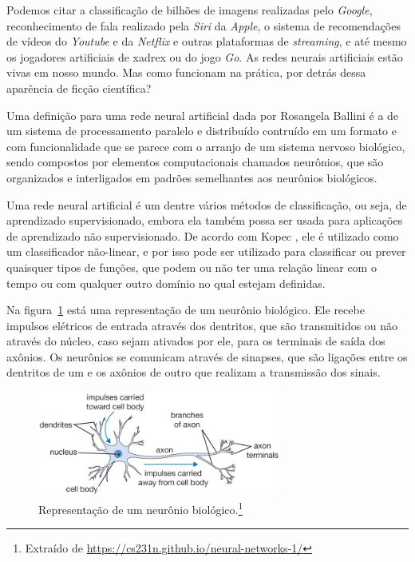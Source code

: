 Podemos citar a classificação de bilhões de imagens realizadas pelo \emph{Google}, reconhecimento de fala realizado pela \emph{Siri} da \emph{Apple}, o sistema de recomendações de vídeos do \emph{Youtube} e da \emph{Netflix} e outras plataformas de \emph{streaming}, e até mesmo os jogadores artificiais de xadrex ou do jogo \emph{Go}. As redes neurais artificiais estão vivas em nosso mundo. Mas como funcionam na prática, por detrás dessa aparência de ficção científica?

Uma definição para uma rede neural artificial dada por Rosangela Ballini \citep{doutorado} é a de um sistema de processamento paralelo e distribuído contruído em um formato e com funcionalidade que se parece com o arranjo de um sistema nervoso biológico, sendo compostos por elementos computacionais chamados neurônios, que são organizados e interligados em padrões semelhantes aos neurônios biológicos.

Uma rede neural artificial é um dentre vários métodos de classificação, ou seja, de aprendizado supervisionado, embora ela também possa ser usada para aplicações de aprendizado não supervisionado. De acordo com Kopec \citep{classic}, ele é utilizado como um classificador não-linear, e por isso pode ser utilizado para classificar ou prever quaisquer tipos de funções, que podem ou não ter uma relação linear com o tempo ou com qualquer outro domínio no qual estejam definidas.

Na figura~\ref{fig:neuron} está uma representação de um neurônio biológico. Ele recebe impulsos elétricos de entrada através dos dentritos, que são transmitidos ou não através do núcleo, caso sejam ativados por ele, para os terminais de saída dos axônios. Os neurônios se comunicam através de sinapses, que são ligações entre os dentritos de um e os axônios de outro que realizam a transmissão dos sinais. 

\begin{figure}[htb]
\centering
\includegraphics[width=8cm]{figuras/neuron}
\caption{Representação de um neurônio biológico.\footnote{Extraído de \url{https://cs231n.github.io/neural-networks-1/}}}
\label{fig:neuron}
\end{figure}

